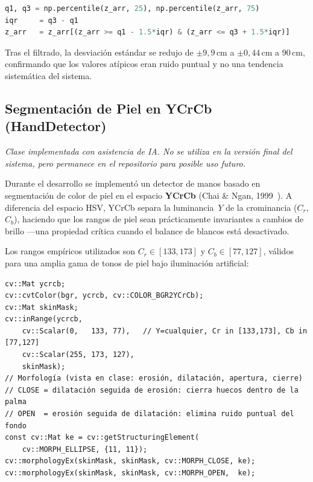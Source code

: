 \documentclass[12pt, a4paper]{article}
\begin{document}
\begin{lstlisting}[style=cppstyle, language=Python,
  caption={Filtrado IQR en collect\_measurements.py.}]
q1, q3 = np.percentile(z_arr, 25), np.percentile(z_arr, 75)
iqr     = q3 - q1
z_arr   = z_arr[(z_arr >= q1 - 1.5*iqr) & (z_arr <= q3 + 1.5*iqr)]
\end{lstlisting}

\noindent Tras el filtrado, la desviación estándar se redujo de $\pm9{,}9$\,cm a
$\pm0{,}44$\,cm a 90\,cm, confirmando que los valores atípicos eran ruido
puntual y no una tendencia sistemática del sistema.

\subsection{Segmentación de Piel en YCrCb (HandDetector)}
\label{sec:ycrcb}

\emph{Clase implementada con asistencia de IA. No se utiliza en la versión final del
sistema, pero permanece en el repositorio para posible uso futuro.}

Durante el desarrollo se implementó un detector de manos basado en segmentación de
color de piel en el espacio \textbf{YCrCb} (Chai \& Ngan, 1999~\cite{chai1999face}).
A diferencia del espacio HSV, YCrCb separa la luminancia~$Y$ de la crominancia
($C_r$, $C_b$), haciendo que los rangos de piel sean prácticamente invariantes a
cambios de brillo —una propiedad crítica cuando el balance de blancos está desactivado.

Los rangos empíricos utilizados son $C_r \in [133, 173]$ y $C_b \in [77, 127]$,
válidos para una amplia gama de tonos de piel bajo iluminación artificial:

\begin{lstlisting}[style=cppstyle, caption={Segmentación YCrCb en HandDetector.cpp.}]
cv::Mat ycrcb;
cv::cvtColor(bgr, ycrcb, cv::COLOR_BGR2YCrCb);
cv::Mat skinMask;
cv::inRange(ycrcb,
    cv::Scalar(0,   133, 77),   // Y=cualquier, Cr in [133,173], Cb in [77,127]
    cv::Scalar(255, 173, 127),
    skinMask);
// Morfología (vista en clase: erosión, dilatación, apertura, cierre)
// CLOSE = dilatación seguida de erosión: cierra huecos dentro de la palma
// OPEN  = erosión seguida de dilatación: elimina ruido puntual del fondo
const cv::Mat ke = cv::getStructuringElement(
    cv::MORPH_ELLIPSE, {11, 11});
cv::morphologyEx(skinMask, skinMask, cv::MORPH_CLOSE, ke);
cv::morphologyEx(skinMask, skinMask, cv::MORPH_OPEN,  ke);
\end{lstlisting}
\end{document}
